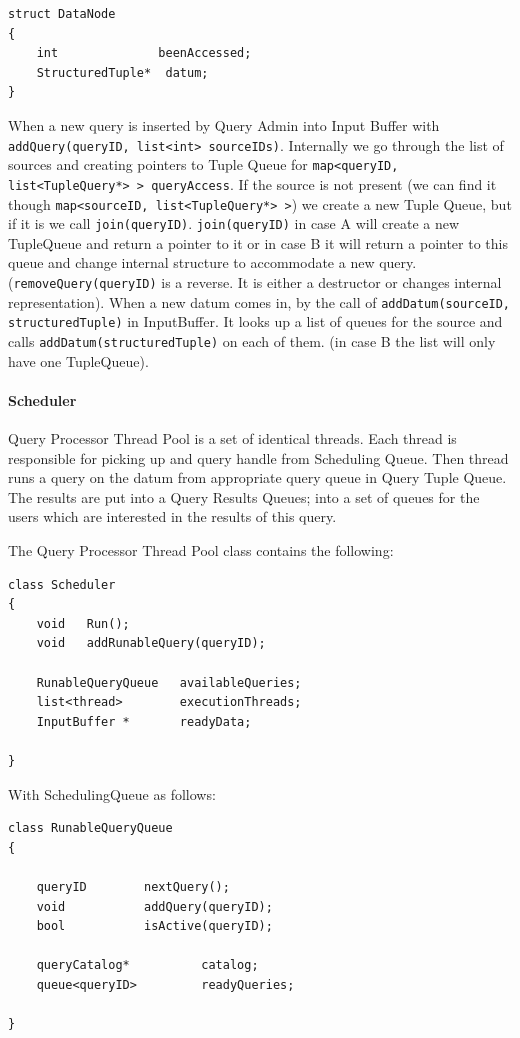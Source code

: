 \documentclass[11pt]{article}
\begin{document}
\begin{verbatim}
struct DataNode
{
    int              beenAccessed;
    StructuredTuple*  datum;
}
\end{verbatim}

When a new query is inserted by Query Admin into Input Buffer with {\tt addQuery(queryID, list<int> sourceIDs)}. Internally we go through the list of sources and creating pointers to Tuple Queue for {\tt map<queryID, list<TupleQuery*> >   queryAccess}. If the source is not present (we can find it though {\tt map<sourceID, list<TupleQuery*> >}) we create a new Tuple Queue, but if it is we call {\tt join(queryID)}. {\tt join(queryID)} in case A will create a new TupleQueue and return a pointer to it or in case B it will return a pointer to this queue and change internal structure to accommodate a new query. ({\tt removeQuery(queryID)} is a reverse. It is either a destructor or changes internal representation). When a new datum comes in, by the call of {\tt addDatum(sourceID, structuredTuple)} in InputBuffer. It looks up a list of queues for the source and calls {\tt addDatum(structuredTuple)} on each of them. (in case B the list will only have one TupleQueue).

\paragraph{Scheduler}

Query Processor Thread Pool is a set of identical threads. Each thread is responsible for picking up and query handle from Scheduling Queue. Then thread runs a query on the datum from appropriate query queue in Query Tuple Queue. The results are put into a Query Results Queues; into a set of queues for the users which are interested in the results of this query. 

The Query Processor Thread Pool class contains the following:

\begin{verbatim}
class Scheduler
{
    void   Run();
    void   addRunableQuery(queryID);

    RunableQueryQueue   availableQueries;
    list<thread>        executionThreads;
    InputBuffer *       readyData;
	
}
\end{verbatim}

\noindent With SchedulingQueue as follows:

\begin{verbatim}
class RunableQueryQueue
{
    
    queryID        nextQuery();
    void           addQuery(queryID);
    bool           isActive(queryID);

    queryCatalog*          catalog;
    queue<queryID>         readyQueries;
	
}
\end{verbatim}
\end{document}
